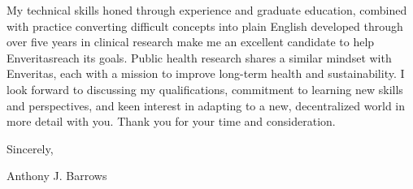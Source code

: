 \documentclass[letterpaper,11pt]{article}
\newcommand{\company}{Enveritas}
\newcommand{\actionStatment}{
	My technical skills honed through experience and graduate education, combined with practice converting difficult concepts into plain English developed through over five years in clinical research make me an excellent candidate to help \company \space reach its goals. Public health research shares a similar mindset with Enveritas, each with a mission to improve long-term health and sustainability.
}
\begin{document}
	\actionStatment I look forward to discussing my qualifications, commitment to learning new skills and perspectives, and keen interest in adapting to a new, decentralized world in more detail with you. Thank you for your time and consideration.
	
	\vspace{5mm}
	
	Sincerely,
	\vspace{3mm}
	
	Anthony J. Barrows
\end{document}
